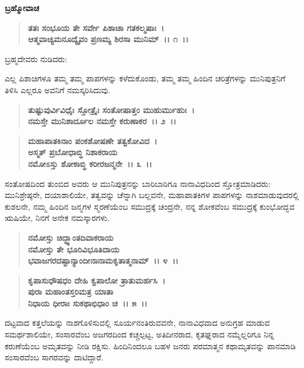 \emptypage

\begin{flushleft}
\textbf{ಬ್ರಹ್ಮೋವಾಚ\enginline{-}}
\end{flushleft}

\begin{verse}
\textbf{ತತಃ ಸಂಭೂಯ ತೇ ಸರ್ವೇ ಪಿಶಾಚಾ ಗತಕಲ್ಮಷಾಃ~।}\\\textbf{ಆತ್ಮವಾಚ್ಯಮನೂದ್ಯೈವಂ ಪ್ರಣಮ್ಯ ಶಿರಸಾ ಮುನಿಮ್~।। ೧~।।}
\end{verse}

\begin{flushleft}
ಬ್ರಹ್ಮದೇವರು ನುಡಿದರು:
\end{flushleft}

ಎಲ್ಲ ಪಿಶಾಚಿಗಳೂ ತಮ್ಮ ತಮ್ಮ ಪಾಪಗಳನ್ನು ಕಳೆದುಕೊಂಡು, ತಮ್ಮ ತಮ್ಮ ಹಿಂದಿನ ಚರಿತ್ರೆಗಳನ್ನು ಮುನಿಪುತ್ರನಿಗೆ ತಿಳಿಸಿ ಎಲ್ಲರೂ ಅವನಿಗೆ ನಮಸ್ಕರಿಸಿದುವು.

\begin{verse}
\textbf{ತುಷ್ಟುವುರ್ವಿವಿಧೈಃ ಸ್ತೋತ್ರೈಃ ಸಂತೋಷಾತ್ತಂ ಮುಹುರ್ಮುಹುಃ~।}\\\textbf{ನಮಸ್ತೇ ಮುನಿಶಾರ್ದೂಲ ನಮಸ್ತೇ ಕರುಣಾಕರ~।। ೨~।। }
\end{verse}

\begin{verse}
\textbf{ಮಹಾಪಾತಕಿನಾಂ ಪಂಕಶೋಷಣೇ ತತ್ವಕೋವಿದ~।}\\\textbf{ಅಸ್ಮತ್ ಪ್ರಬೋಧಾಬ್ಧಿ ನಿಶಾಕರಾಯ} \\\textbf{ನಮೋಽಸ್ತು ಶೋಕಾಬ್ಧಿ ಕರೀರಜನ್ಮನೇ~।। ೩~।।}
\end{verse}

ಸಂತೋಷದಿಂದ ತುಂಬಿದ ಅವರು ಆ ಮುನಿಪುತ್ರನನ್ನು ಬಾರಿಬಾರಿಗೂ ನಾನಾವಿಧದಿಂದ ಸ್ತೋತ್ರಮಾಡಿದರು: ಮುನಿಶ್ರೇಷ್ಠನೇ, ದಯಾಶಾಲಿಯೇ, ತತ್ವವನ್ನು ಚೆನ್ನಾಗಿ ಬಲ್ಲವನೇ, ಮಹಾಪಾತಕಿಗಳ ಪಾಪಗಳನ್ನು ನಾಶಮಾಡುವುದರಲ್ಲಿ ಕುಶಲನೇ, ನಮ್ಮ ಹಿಂದಿನ ಜನ್ಮಗಳ ಸ್ಮರಣೆಯೆಂಬ ಸಮುದ್ರಕ್ಕೆ ಚಂದ್ರನೇ, ನನ್ನ ಶೋಕವೆಂಬ ಸಮುದ್ರಕ್ಕೆ ಕುಂಭೋದ್ಭವ ಋಷಿಯೇ, ನಿನಗೆ ಅನೇಕ ನಮಸ್ಕಾರಗಳು.

\begin{verse}
\textbf{ನಮೋಸ್ತು ಚಿದ್ಧ್ವಾಂತದಿವಾಕರಾಯ} \\\textbf{ನಮೋಸ್ತು ತೇ ಭೂರಿವಿಭೂತಿದಾಯ}\\\textbf{ಭವಾಜಗರದಷ್ಟಾನ್ಯಾಂದೀನಾನಾಮಕೃತಾತ್ಮನಾಮ್~।। ೪~।।} 
\end{verse}

\begin{verse}
\textbf{ಕೃಪಾಸುಧೌಷಧಂ ದೇಹಿ ಕ್ವಪಾಲೋ ತ್ರಾತುಮರ್ಹಸಿ~।}\\\textbf{ಪುರಾ ಮಹಾಂತಸ್ತರಿಮತ್ರ ಯಾತಾ}\\\textbf{ನಿಧಾಯ ಧೀರಾಃ ಸುಕಥಾಭಿಧಾಂ ಚ~।। ೫~।।}
\end{verse}

ದಟ್ಟವಾದ ಕತ್ತಲೆಯನ್ನು ನಾಶಗೊಳಿಸುವಲ್ಲಿ ಸೂರ್ಯನಂತಿರುವವನೇ, ನಾನಾವಿಧವಾದ ಅನುಗ್ರಹ ಮಾಡುವ ಸಮರ್ಥಶಾಲಿಯೇ, ಸಂಸಾರವೆಂಬ ಅಜಗರದಿಂದ ಕಚ್ಚಲ್ಪಟ್ಟ, ಅತಿ\-ದೀನರಾದ, ಕೃತಘ್ನರಾದ ನಮ್ಮೆಲ್ಲರಿಗೂ ನಿನ್ನ ಕರುಣೆಯೆಂಬ ಅಮೃತವನ್ನು ನೀಡಿ ರಕ್ಷಿಸು. ಹಿಂದಿನಿಂದಲೂ ಬಹಳ ಜನರು ಪರಮಾತ್ಮನ ಕಥಾಮೃತವನ್ನು ಪಾನಮಾಡಿ ಸಂಸಾರವೆಂಬ ಸಾಗರವನ್ನು ದಾಟಿದ್ದಾರೆ.

